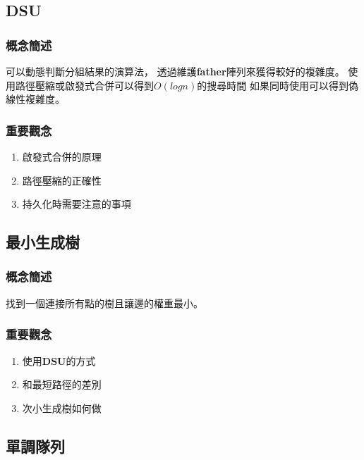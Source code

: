 \documentclass[12pt,oneside]{article}
\begin{document}
\clearpage


\subsection{DSU}
\subsubsection*{概念簡述}
可以動態判斷分組結果的演算法，
透過維護\textbf{father}陣列來獲得較好的複雜度。
使用路徑壓縮或啟發式合併可以得到$O(logn)$的搜尋時間
如果同時使用可以得到偽線性複雜度。

\subsubsection*{重要觀念}
\begin{adjustwidth}{2em}{0em}
\begin{enumerate}
    \item
        啟發式合併的原理
    \item 
        路徑壓縮的正確性
    \item
        持久化時需要注意的事項
\end{enumerate}
\end{adjustwidth}
\clearpage

\subsection{最小生成樹}
\subsubsection*{概念簡述}
找到一個連接所有點的樹且讓邊的權重最小。

\subsubsection*{重要觀念}
\begin{adjustwidth}{2em}{0em}
\begin{enumerate}
    \item 
        使用\textbf{DSU}的方式
    \item 
        和最短路徑的差別
    \item 
        次小生成樹如何做
\end{enumerate}
\end{adjustwidth}
\clearpage




\subsection{單調隊列}
\end{document}
